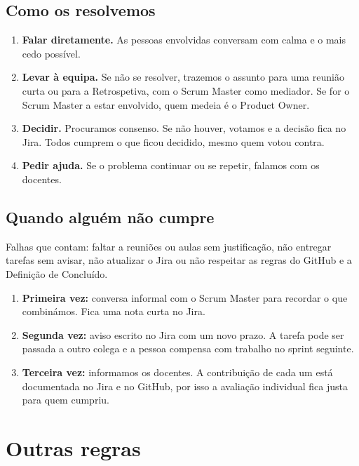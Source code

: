 \documentclass[11pt,a4paper]{article}
\begin{document}
\subsection{Como os resolvemos}

\begin{enumerate}
  \item \textbf{Falar diretamente.} As pessoas envolvidas conversam com calma e o mais cedo possível.
  \item \textbf{Levar à equipa.} Se não se resolver, trazemos o assunto para uma reunião curta ou para a Retrospetiva, com o Scrum Master como mediador. Se for o Scrum Master a estar envolvido, quem medeia é o Product Owner.
  \item \textbf{Decidir.} Procuramos consenso. Se não houver, votamos e a decisão fica no Jira. Todos cumprem o que ficou decidido, mesmo quem votou contra.
  \item \textbf{Pedir ajuda.} Se o problema continuar ou se repetir, falamos com os docentes.
\end{enumerate}

\subsection{Quando alguém não cumpre}

Falhas que contam: faltar a reuniões ou aulas sem justificação, não entregar tarefas sem avisar, não atualizar o Jira ou não respeitar as regras do GitHub e a Definição de Concluído.

\begin{enumerate}
  \item \textbf{Primeira vez:} conversa informal com o Scrum Master para recordar o que combinámos. Fica uma nota curta no Jira.
  \item \textbf{Segunda vez:} aviso escrito no Jira com um novo prazo. A tarefa pode ser passada a outro colega e a pessoa compensa com trabalho no sprint seguinte.
  \item \textbf{Terceira vez:} informamos os docentes. A contribuição de cada um está documentada no Jira e no GitHub, por isso a avaliação individual fica justa para quem cumpriu.
\end{enumerate}


\section{Outras regras}
\end{document}
